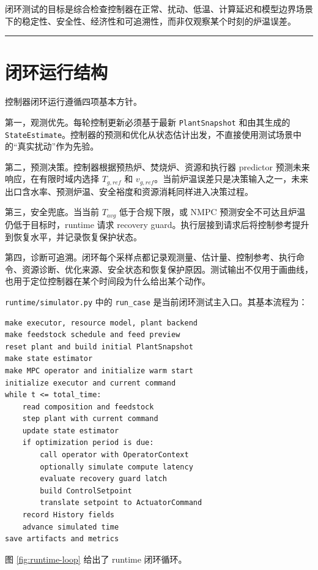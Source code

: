 \documentclass[UTF8,openany,zihao=-4,oneside]{ctexbook}
\providecommand{\passthrough}[1]{#1}
\newcommand{\manualdivider}{\par\vspace{0.6em}\noindent\textcolor{FGLine}{\rule{\linewidth}{0.7pt}}\vspace{0.6em}\par}
\begin{document}
闭环测试的目标是综合检查控制器在正常、扰动、低温、计算延迟和模型边界场景下的稳定性、安全性、经济性和可追溯性，而非仅观察某个时刻的炉温误差。

\manualdivider

\section{闭环运行结构}\label{sec:closed-loop-principles}

控制器闭环运行遵循四项基本方针。

第一，观测优先。每轮控制更新必须基于最新 \passthrough{\lstinline!PlantSnapshot!} 和由其生成的 \passthrough{\lstinline!StateEstimate!}。控制器的预测和优化从状态估计出发，不直接使用测试场景中的“真实扰动”作为先验。

第二，预测决策。控制器根据预热炉、焚烧炉、资源和执行器 predictor 预测未来响应，在有限时域内选择 \(T_{g,ref}\) 和 \(v_{g,ref}\)。当前炉温误差只是决策输入之一，未来出口含水率、预测炉温、安全裕度和资源消耗同样进入决策过程。

第三，安全兜底。当当前 \(T_{avg}\) 低于合规下限，或 NMPC 预测安全不可达且炉温仍低于目标时，runtime 请求 recovery guard。执行层接到请求后将控制参考提升到恢复水平，并记录恢复保护状态。

第四，诊断可追溯。闭环每个采样点都记录观测量、估计量、控制参考、执行命令、资源诊断、优化来源、安全状态和恢复保护原因。测试输出不仅用于画曲线，也用于定位控制器在某个时间段为什么给出某个动作。

\passthrough{\lstinline!runtime/simulator.py!} 中的 \passthrough{\lstinline!run_case!} 是当前闭环测试主入口。其基本流程为：

\begin{lstlisting}
make executor, resource model, plant backend
make feedstock schedule and feed preview
reset plant and build initial PlantSnapshot
make state estimator
make MPC operator and initialize warm start
initialize executor and current command
while t <= total_time:
    read composition and feedstock
    step plant with current command
    update state estimator
    if optimization period is due:
        call operator with OperatorContext
        optionally simulate compute latency
        evaluate recovery guard latch
        build ControlSetpoint
        translate setpoint to ActuatorCommand
    record History fields
    advance simulated time
save artifacts and metrics
\end{lstlisting}

图 \ref{fig:runtime-loop} 给出了 runtime 闭环循环。
\end{document}
